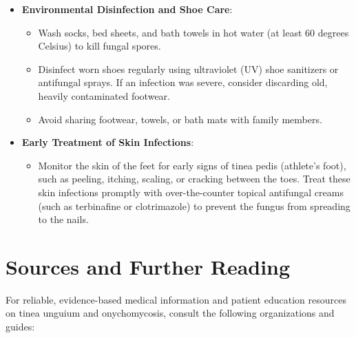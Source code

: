 \begin{itemize}
\begin{itemize}
    \end{itemize}
    \item \textbf{Environmental Disinfection and Shoe Care}:
    \begin{itemize}
        \item Wash socks, bed sheets, and bath towels in hot water (at least 60 degrees Celsius) to kill fungal spores.
        \item Disinfect worn shoes regularly using ultraviolet (UV) shoe sanitizers or antifungal sprays. If an infection was severe, consider discarding old, heavily contaminated footwear.
        \item Avoid sharing footwear, towels, or bath mats with family members.
    \end{itemize}
    \item \textbf{Early Treatment of Skin Infections}:
    \begin{itemize}
        \item Monitor the skin of the feet for early signs of tinea pedis (athlete's foot), such as peeling, itching, scaling, or cracking between the toes. Treat these skin infections promptly with over-the-counter topical antifungal creams (such as terbinafine or clotrimazole) to prevent the fungus from spreading to the nails.
    \end{itemize}
\end{itemize}

\section*{Sources and Further Reading}
For reliable, evidence-based medical information and patient education resources on tinea unguium and onychomycosis, consult the following organizations and guides:

